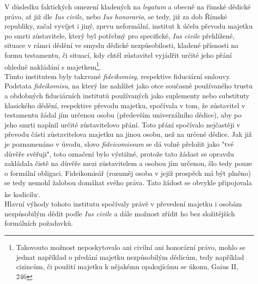 \documentclass{article}
\begin{document}
V důsledku faktických omezení kladených na \textit{legatum} a obecně na římské dědické právo, ať již dle \textit{Ius civile}, nebo \textit{Ius honorario}, se tedy, již za dob Římské republiky, začal vyvíjet i jiný, zprvu neformální, institut k účelu převodu majetku po smrti zůstavitele, který byl potřebný pro specifické, \textit{Ius civile} přehlížené, situace v rámci dědění ve smyslu dědické nezpůsobilosti, kladené přísnosti na formu testamentu, či situací, kdy chtěl zůstavitel vyjádřit určité jeho přání ohledně nakládání s majetkem\footnote{Takovouto možnost neposkytovalo ani civilní ani honorární právo, mohlo se jednat například o předání majetku nezpůsobilým dědicům, tedy například cizincům, či použití majetku k nějakému opakujícímu se úkonu, Gaius II, 246}.\\

 Tímto institutem byly takzvané \textit{fideikomisy}, respektive fiduciární smlouvy. Podstata \textit{fideikomisu}, na který lze nahlížet jako otce současně používaného trustu a obdobných fiduciárních institutů používaných jako suplementy nebo substituty klasického dědění, respektive převodu majetku, spočívala v tom, že zůstavitel v testamentu žádal jím určenou osobu (především univerzálního dědice), aby po jeho smrti naplnil určité zůstavitelovo přání. Toto přání spočívalo nejčastěji v převodu části zůstavitelova majetku na jinou osobu, než na určené dědice. Jak již je poznamenáno v úvodu, slovo \textit{fideicomissum} se dá volně přeložit jako "tvé důvěře svěřuji", toto označení bylo výstižné, protože tato žádast se opravdu zakládala čistě na důvěře mezi zůstavitelem a osobou jím určenou, šlo tedy pouze o formální obligaci. Fideikomisář (rozuměj osoba v jejíž prospěch má být plněno) se tedy nemohl žalobou domáhat svého práva. Tato žádost se obvykle připojovala ke kodicilu\textsuperscript{,}. \\

Hlavní výhody tohoto institutu spočívaly právě v převedení majetku i osobám nezpůsobilým dědit podle \textit{Ius civile} a dále možnost zřídit ho bez složitějších formálních požadavků.\\

\end{document}
